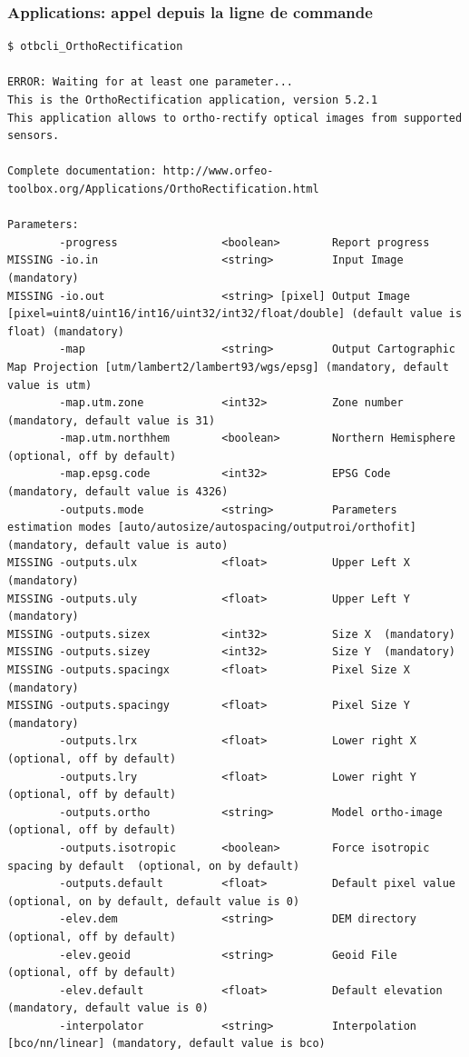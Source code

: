 \documentclass[8pt]{beamer}
\begin{document}
\begin{frame}[fragile]
\frametitle{Applications: appel depuis la ligne de commande}
\begin{scriptsize}
\vspace{-0.5cm}\begin{verbatim}
$ otbcli_OrthoRectification 

ERROR: Waiting for at least one parameter...
This is the OrthoRectification application, version 5.2.1
This application allows to ortho-rectify optical images from supported sensors.

Complete documentation: http://www.orfeo-toolbox.org/Applications/OrthoRectification.html

Parameters: 
        -progress                <boolean>        Report progress 
MISSING -io.in                   <string>         Input Image  (mandatory)
MISSING -io.out                  <string> [pixel] Output Image  [pixel=uint8/uint16/int16/uint32/int32/float/double] (default value is float) (mandatory)
        -map                     <string>         Output Cartographic Map Projection [utm/lambert2/lambert93/wgs/epsg] (mandatory, default value is utm)
        -map.utm.zone            <int32>          Zone number  (mandatory, default value is 31)
        -map.utm.northhem        <boolean>        Northern Hemisphere  (optional, off by default)
        -map.epsg.code           <int32>          EPSG Code  (mandatory, default value is 4326)
        -outputs.mode            <string>         Parameters estimation modes [auto/autosize/autospacing/outputroi/orthofit] (mandatory, default value is auto)
MISSING -outputs.ulx             <float>          Upper Left X  (mandatory)
MISSING -outputs.uly             <float>          Upper Left Y  (mandatory)
MISSING -outputs.sizex           <int32>          Size X  (mandatory)
MISSING -outputs.sizey           <int32>          Size Y  (mandatory)
MISSING -outputs.spacingx        <float>          Pixel Size X  (mandatory)
MISSING -outputs.spacingy        <float>          Pixel Size Y  (mandatory)
        -outputs.lrx             <float>          Lower right X  (optional, off by default)
        -outputs.lry             <float>          Lower right Y  (optional, off by default)
        -outputs.ortho           <string>         Model ortho-image  (optional, off by default)
        -outputs.isotropic       <boolean>        Force isotropic spacing by default  (optional, on by default)
        -outputs.default         <float>          Default pixel value  (optional, on by default, default value is 0)
        -elev.dem                <string>         DEM directory  (optional, off by default)
        -elev.geoid              <string>         Geoid File  (optional, off by default)
        -elev.default            <float>          Default elevation  (mandatory, default value is 0)
        -interpolator            <string>         Interpolation [bco/nn/linear] (mandatory, default value is bco)
\end{verbatim}
\end{scriptsize}
\end{frame}
\end{document}
